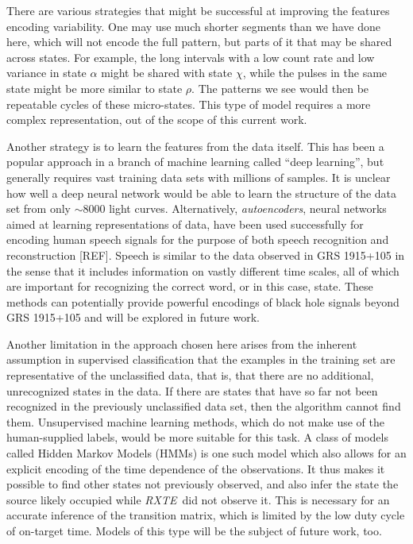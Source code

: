\documentclass[12pt]{emulateapj}
\newcommand{\project}[1]{\textsl{#1}}
\newcommand{\rxte}{\project{RXTE}}
\begin{document}
There are various strategies that might be successful at improving the features encoding variability. One may use much shorter segments than we have done here, 
which will not encode the full pattern, but parts of it that may be shared across states. For example, the long intervals with a low count rate and low variance in state 
$\alpha$ might be shared with state $\chi$, while the pulses in the same state might be more similar to state $\rho$. The patterns we see would then be repeatable 
cycles of these micro-states. This type of model requires a more complex representation, out of the scope of this current work. 

Another strategy is to learn the features from the data itself. This has been a popular approach in a branch of machine learning called ``deep learning'', but generally 
requires vast training data sets with millions of samples. It is unclear how well a deep neural network would be able to learn the structure of the data set from only 
$\sim 8000$ light curves. Alternatively, \textit{autoencoders}, neural networks aimed at learning representations of data, have been used successfully for encoding 
human speech signals for the purpose of both speech recognition and reconstruction [REF]. Speech is similar to the data observed in GRS 1915+105 in the sense 
that it includes information on vastly different time scales, all of which are important for recognizing the correct word, or in this case, state. These methods can 
potentially provide powerful encodings of black hole signals beyond GRS 1915+105 and will be explored in future work. 

Another limitation in the approach chosen here arises from the inherent assumption in supervised classification that the examples in the training set are representative of the unclassified data, that is, that there are no additional, unrecognized states in the data. If there are states that have so far not been 
recognized in the previously unclassified data set, then the algorithm cannot find them. Unsupervised machine learning methods, which do not make 
use of the human-supplied labels, would be more suitable for this task. A class of models called Hidden Markov Models (HMMs) is one such model which also 
allows for an explicit encoding of the time dependence of the observations. It thus makes it possible to find other states not previously observed, and also infer 
the state the source likely occupied while \rxte\ did not observe it. This is necessary for an accurate inference of the transition matrix, which is limited by the 
low duty cycle of on-target time. Models of this type will be the subject of future work, too.
\end{document}
